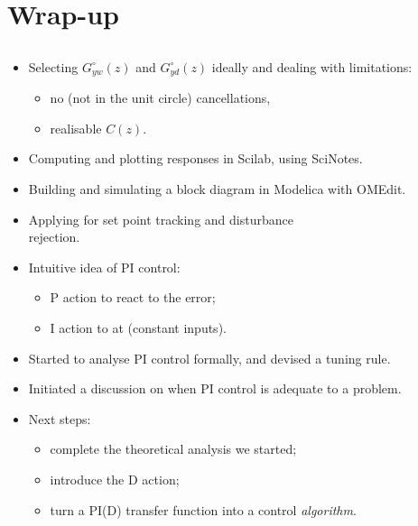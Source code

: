 \section{Wrap-up}
\subsection{}

\begin{frame}
 \begin{itemize}[<+-| alert@+>]
 \item Selecting $G_{yw}^{\circ}(z)$ and $G_{yd}^{\circ}(z)$ ideally and dealing
       with limitations:
       \begin{itemize}[<+-| alert@+>]
       \item no  (not in the unit circle) cancellations,
       \item realisable $C(z)$. 
       \end{itemize}
 \item Computing and plotting responses in Scilab, using SciNotes.
 \item Building and simulating a block diagram in Modelica with OMEdit.
 \item Applying  for set point tracking and disturbance\\
       rejection.
 \end{itemize}
\end{frame}

\begin{frame}
 \begin{itemize}[<+-| alert@+>]
 \item Intuitive idea of PI control:
       \begin{itemize}[<+-| alert@+>]
       \item P action to react  to the error;
       \item I action to  at  (constant inputs).
       \end{itemize}
 \item Started to analyse PI control formally, and devised a tuning rule.
 \item Initiated a discussion on when PI control is adequate to a problem.
 \item \vfill Next steps:
       \begin{itemize}[<+-| alert@+>]
       \item complete the theoretical analysis we started;
       \item introduce the D action;
       \item turn a PI(D) transfer function into a control \emph{algorithm}.
       \end{itemize}
 \end{itemize}
\end{frame}



